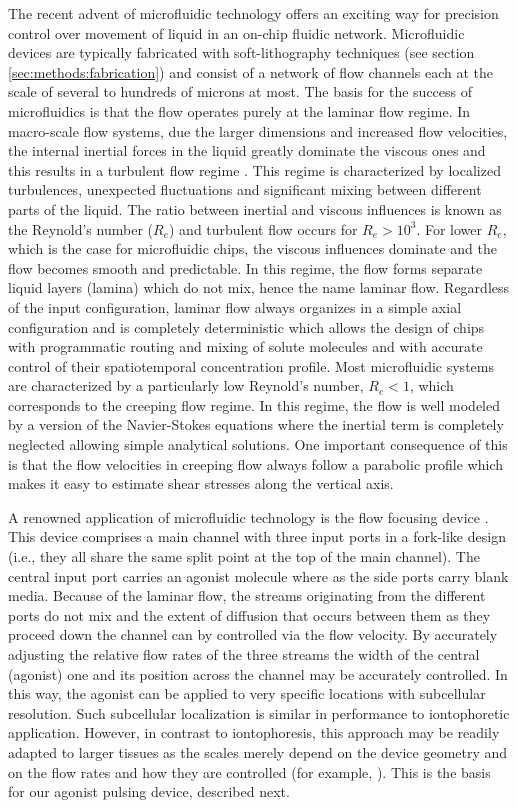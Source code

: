     The recent advent of microfluidic technology offers an exciting way for precision control over movement of liquid in an on-chip fluidic network. Microfluidic devices are typically fabricated with soft-lithography techniques (see section \ref{sec:methods:fabrication}) and consist of a network of flow channels each at the scale of several to hundreds of microns at most. The basis for the success of microfluidics is that the flow operates purely at the laminar flow regime. In macro-scale flow systems, due the larger dimensions and increased flow velocities, the internal inertial forces in the liquid greatly dominate the viscous ones and this results in a turbulent flow regime \cite{fluidBook}. This regime is characterized by localized turbulences, unexpected fluctuations and significant mixing between different parts of the liquid. The ratio between inertial and viscous influences is known as the Reynold's number (\(R_{e}\)) and turbulent flow occurs for \(R_{e}>10^{3}\). For lower \(R_{e}\), which is the case for microfluidic chips, the viscous influences dominate and the flow becomes smooth and predictable. In this regime, the flow forms separate liquid layers (lamina) which do not mix, hence the name laminar flow. Regardless of the input configuration, laminar flow always organizes in a simple axial configuration and is completely deterministic which allows the design of chips with programmatic routing and mixing of solute molecules and with accurate control of their spatiotemporal concentration profile. Most microfluidic systems are characterized by a particularly low Reynold's number, \(R_{e}<1\), which corresponds to the creeping flow regime. In this regime, the flow is well modeled by a version of the Navier-Stokes equations where the inertial term is completely neglected allowing simple analytical solutions. One important consequence of this is that the flow velocities in creeping flow always follow a parabolic profile which makes it easy to estimate shear stresses along the vertical axis.

    A renowned application of microfluidic technology is the flow focusing device \cite{takayama2001laminar}. This device comprises a main channel with three input ports in a fork-like design (i.e., they all share the same split point at the top of the main channel). The central input port carries an agonist molecule where as the side ports carry blank media. Because of the laminar flow, the streams originating from the different ports do not mix and the extent of diffusion that occurs between them as they proceed down the channel can by controlled via the flow velocity. By accurately adjusting the relative flow rates of the three streams the width of the central (agonist) one and its position across the channel may be accurately controlled. In this way, the agonist can be applied to very specific locations with subcellular resolution. Such subcellular localization is similar in performance to iontophoretic application. However, in contrast to iontophoresis, this approach may be readily adapted to larger tissues as the scales merely depend on the device geometry and on the flow rates and how they are controlled (for example, \cite{thomas2013chamber}). This is the basis for our agonist pulsing device, described next.

